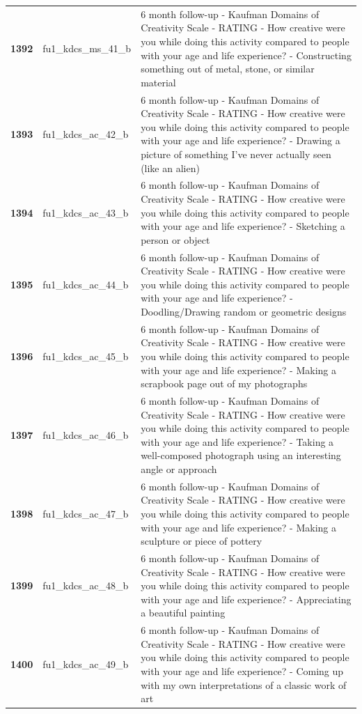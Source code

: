 \documentclass[
  letterpaper,
  DIV=11,
  numbers=noendperiod]{scrartcl}
\begin{document}
\begin{longtable}[t]{>{}cll}
\textbf{1392} & fu1\_kdcs\_ms\_41\_b & 6 month follow-up - Kaufman Domains of Creativity Scale - RATING - How creative were you while doing this activity compared to people with your age and life experience? - Constructing something out of metal, stone, or similar material\\
\textbf{1393} & fu1\_kdcs\_ac\_42\_b & 6 month follow-up - Kaufman Domains of Creativity Scale - RATING - How creative were you while doing this activity compared to people with your age and life experience? - Drawing a picture of something I've never actually seen (like an alien)\\
\textbf{1394} & fu1\_kdcs\_ac\_43\_b & 6 month follow-up - Kaufman Domains of Creativity Scale - RATING - How creative were you while doing this activity compared to people with your age and life experience? - Sketching a person or object\\
\textbf{1395} & fu1\_kdcs\_ac\_44\_b & 6 month follow-up - Kaufman Domains of Creativity Scale - RATING - How creative were you while doing this activity compared to people with your age and life experience? - Doodling/Drawing random or geometric designs\\
\addlinespace
\textbf{1396} & fu1\_kdcs\_ac\_45\_b & 6 month follow-up - Kaufman Domains of Creativity Scale - RATING - How creative were you while doing this activity compared to people with your age and life experience? - Making a scrapbook page out of my photographs\\
\textbf{1397} & fu1\_kdcs\_ac\_46\_b & 6 month follow-up - Kaufman Domains of Creativity Scale - RATING - How creative were you while doing this activity compared to people with your age and life experience? - Taking a well-composed photograph using an interesting angle or approach\\
\textbf{1398} & fu1\_kdcs\_ac\_47\_b & 6 month follow-up - Kaufman Domains of Creativity Scale - RATING - How creative were you while doing this activity compared to people with your age and life experience? - Making a sculpture or piece of pottery\\
\textbf{1399} & fu1\_kdcs\_ac\_48\_b & 6 month follow-up - Kaufman Domains of Creativity Scale - RATING - How creative were you while doing this activity compared to people with your age and life experience? - Appreciating a beautiful painting\\
\textbf{1400} & fu1\_kdcs\_ac\_49\_b & 6 month follow-up - Kaufman Domains of Creativity Scale - RATING - How creative were you while doing this activity compared to people with your age and life experience? - Coming up with my own interpretations of a classic work of art\\

\end{longtable}
\end{document}
